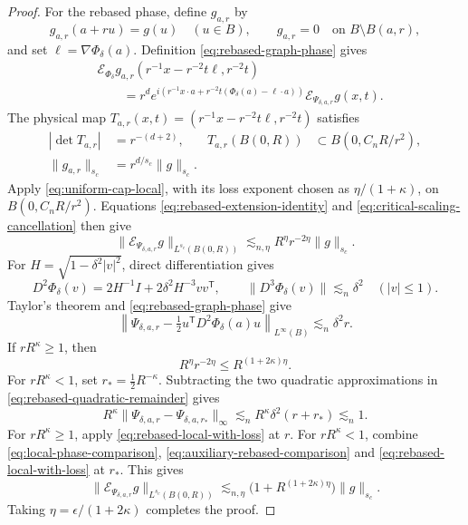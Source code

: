 \documentclass[11pt]{article}
\numberwithin{equation}{section}
\newcommand{\norm}[1]{\lVert #1\rVert}
\newcommand{\abs}[1]{\lvert #1\rvert}
\begin{document}
\begin{proof}
For the rebased phase, define \(g_{a,r}\) by
\[
 g_{a,r}(a+ru)=g(u)\quad(u\in B),\qquad
 g_{a,r}=0\quad\text{on }B\setminus B(a,r),
\]
and set \(\ell=\nabla\Phi_\delta(a)\).
Definition \eqref{eq:rebased-graph-phase} gives
\begin{equation}\label{eq:rebased-extension-identity}
\begin{aligned}
 &\mathcal E_{\Phi_\delta}g_{a,r}
       (r^{-1}x-r^{-2}t\ell,r^{-2}t)\\
 &\qquad
 =r^d e^{i(r^{-1}x\cdot a+r^{-2}t(\Phi_\delta(a)-\ell\cdot a))}
       \mathcal E_{\Psi_{\delta,a,r}}g(x,t).
\end{aligned}
\end{equation}
The physical map \(T_{a,r}(x,t)=(r^{-1}x-r^{-2}t\ell,r^{-2}t)\)
satisfies
\begin{align*}
 |\det T_{a,r}|&=r^{-(d+2)},&
 T_{a,r}(B(0,R))&\subset B(0,C_nR/r^2),\\
 \norm{g_{a,r}}_{s_c}&=r^{d/s_c}\norm g_{s_c}.
\end{align*}
Apply \eqref{eq:uniform-cap-local}, with its loss exponent chosen as
\(\eta/(1+\kappa)\), on \(B(0,C_nR/r^2)\).
Equations \eqref{eq:rebased-extension-identity} and
\eqref{eq:critical-scaling-cancellation} then give
\begin{equation}\label{eq:rebased-local-with-loss}
 \norm{\mathcal E_{\Psi_{\delta,a,r}}g}_{L^{s_c}(B(0,R))}
 \lesssim_{n,\eta}R^\eta r^{-2\eta}\norm g_{s_c}.
\end{equation}
For \(H=\sqrt{1-\delta^2\abs v^2}\), direct differentiation gives
\[
 D^2\Phi_\delta(v)=2H^{-1}I+2\delta^2 H^{-3}vv^{\mathsf T},
 \qquad \norm{D^3\Phi_\delta(v)}\lesssim_n \delta^2
 \quad(\abs v\le1).
\]
Taylor's theorem and \eqref{eq:rebased-graph-phase} give
\begin{equation}\label{eq:rebased-quadratic-remainder}
 \left\|\Psi_{\delta,a,r}
 -\tfrac12 u^{\mathsf T}D^2\Phi_\delta(a)u\right\|_{L^\infty(B)}
 \lesssim_n\delta^2r.
\end{equation}
If \(rR^\kappa\ge1\), then
\[
 R^\eta r^{-2\eta}\le R^{(1+2\kappa)\eta}.
\]
For \(rR^\kappa<1\), set \(r_*=\tfrac12R^{-\kappa}\).
Subtracting the two quadratic approximations in
\eqref{eq:rebased-quadratic-remainder} gives
\begin{equation}\label{eq:auxiliary-rebased-comparison}
 R^\kappa\norm{\Psi_{\delta,a,r}-\Psi_{\delta,a,r_*}}_\infty
 \lesssim_n R^\kappa\delta^2(r+r_*)\lesssim_n1.
\end{equation}
For \(rR^\kappa\ge1\), apply \eqref{eq:rebased-local-with-loss}
at \(r\). For \(rR^\kappa<1\), combine
\eqref{eq:local-phase-comparison},
\eqref{eq:auxiliary-rebased-comparison} and
\eqref{eq:rebased-local-with-loss} at \(r_*\). This gives
\[
 \norm{\mathcal E_{\Psi_{\delta,a,r}}g}_{L^{s_c}(B(0,R))}
 \lesssim_{n,\eta}\bigl(1+R^{(1+2\kappa)\eta}\bigr)\norm g_{s_c}.
\]
Taking \(\eta=\epsilon/(1+2\kappa)\) completes the proof.
\end{proof}
\end{document}
